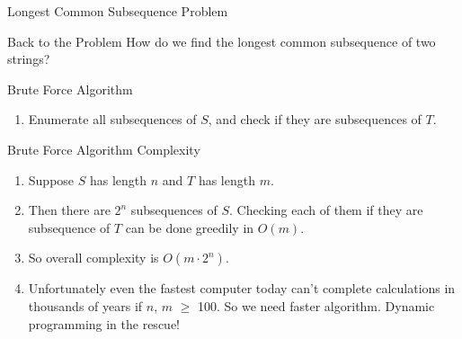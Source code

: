 \documentclass{beamer}
\begin{document}
\begin{frame}{Longest Common Subsequence Problem}
\begin{block}{Back to the Problem}
How do we find the longest common subsequence of two strings?
\end{block}
\end{frame}

\begin{frame}{Brute Force Algorithm}
\begin{enumerate}
    \onslide\item<1-> Enumerate all subsequences of $S$, and check if they are subsequences of $T$.
\end{enumerate}
\end{frame}


\begin{frame}{Brute Force Algorithm Complexity}
\begin{enumerate}
    \onslide\item<1-> Suppose $S$ has length $n$ and $T$ has length $m$.
    \onslide\item<2-> Then there are $2^n$ subsequences of $S$. Checking each of them if they are subsequence of $T$ can be done greedily in $O(m)$. 
    \onslide\item<3-> So overall complexity is $O(m\cdot2^n)$.
    \onslide\item<4-> Unfortunately even the fastest computer today can't complete calculations in thousands of years if $n$, $m$ $\geq$ 100. So we need faster algorithm. Dynamic programming in the rescue!
\end{enumerate}
\end{frame}
\end{document}
